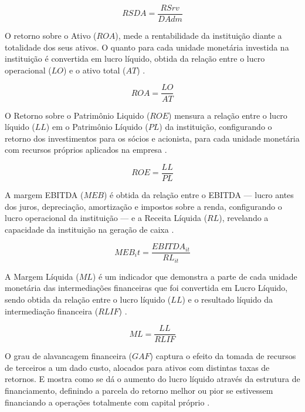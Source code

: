 \documentclass[
  12pt,
  12pt,
  openright,
  oneside,
  a4paper,
  chapter=TITLE,
  section=TITLE,
  subsection=TITLE,
  subsubsection=TITLE,
  english,
  portugues,
  sumario=tradicional]{abntex2}
\begin{document}
\begin{equation}
RSDA = \frac{RSrv_{}}{DAdm{}}
\end{equation}

O retorno sobre o Ativo (\(ROA\)), mede a rentabilidade da instituição diante a totalidade dos seus ativos. O quanto para cada unidade monetária investida na instituição é convertida em lucro líquido, obtida da relação entre o lucro operacional (\(LO\)) e o ativo total (\(AT\)) \cite{assaf:2020}.

\begin{equation}
ROA = \frac{LO}{AT}
\end{equation}

O Retorno sobre o Patrimônio Liquido (\(ROE\)) mensura a relação entre o lucro líquido (\(LL\)) em o Patrimônio Líquido (\(PL\)) da instituição, configurando o retorno dos investimentos para os sócios e acionista, para cada unidade monetária com recursos próprios aplicados na empresa \cite{assaf:2020}.

\begin{equation}
ROE = \frac{LL}{PL}
\end{equation}

A margem EBITDA (\(MEB\)) é obtida da relação entre o EBITDA --- lucro antes dos juros, depreciação, amortização e impostos sobre a renda, configurando o lucro operacional da instituição --- e a Receita Líquida (\(RL\)), revelando a capacidade da instituição na geração de caixa \cite{assaf:2020}.

\begin{equation}
MEB_it = \frac{EBITDA_{it}}{RL_{it}}
\end{equation}

A Margem Líquida (\(ML\)) é um indicador que demonstra a parte de cada unidade monetária das intermediações financeiras que foi convertida em Lucro Líquido, sendo obtida da relação entre o lucro líquido (\(LL\)) e o resultado líquido da intermediação financeira (\(RLIF\)) \cite{assaf:2020}.

\begin{equation}
ML = \frac{LL}{RLIF}
\end{equation}

O grau de alavancagem financeira (\(GAF\)) captura o efeito da tomada de recursos de terceiros a um dado custo, alocados para ativos com distintas taxas de retornos. E mostra como se dá o aumento do lucro líquido através da estrutura de financiamento, definindo a parcela do retorno melhor ou pior se estivessem financiando a operações totalmente com capital próprio \cite{assaf:2020}.
\end{document}
